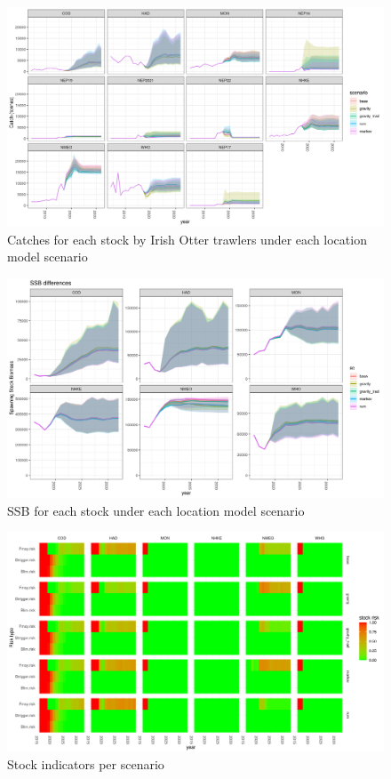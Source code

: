 \documentclass[12pt, halfline, a4paper]{ouparticle}
\begin{document}
\begin{figure}[!ht]
	\centering
	\includegraphics[width=1\linewidth]{figures/IE_Otter_catches}
	\caption{Catches for each stock by Irish Otter trawlers under each
		location model scenario} 
	\label{fig:OtterC}
\end{figure}	

\begin{figure}[!ht]
	\centering
	\includegraphics[width=1\linewidth]{figures/SSB_difference}
	\caption{SSB for each stock under each
		location model scenario} 
	\label{fig:SSB}
\end{figure}	

\begin{figure}[!ht]
	\centering
	\includegraphics[width=1\linewidth]{figures/stock_risks}
	\caption{Stock indicators per scenario} 
	\label{fig:risk}
\end{figure}	







\end{document}
